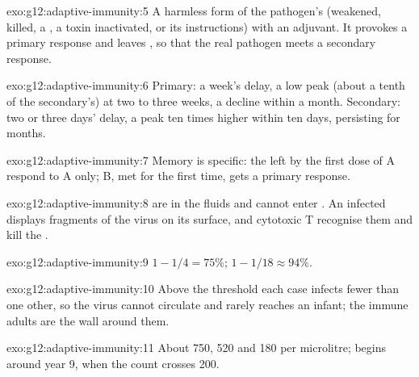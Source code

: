 \begin{solution}{exo:g12:adaptive-immunity:5}
A harmless form of the pathogen's  (weakened, killed, a
, a toxin inactivated, or its instructions) with an adjuvant.
It provokes a primary response and leaves , so that the
real pathogen meets a secondary response.
\end{solution}

\begin{solution}{exo:g12:adaptive-immunity:6}
Primary: a week's delay, a low peak (about a tenth of the
secondary's) at two to three weeks, a decline within a month.
Secondary: two or three days' delay, a peak ten times higher within
ten days, persisting for months.
\end{solution}

\begin{solution}{exo:g12:adaptive-immunity:7}
Memory is specific: the  left by the first dose of A
respond to A only; B, met for the first time, gets a primary response.
\end{solution}

\begin{solution}{exo:g12:adaptive-immunity:8}
 are  in the fluids and cannot enter . An
infected  displays fragments of the virus on its surface, and
cytotoxic T  recognise them and kill the .
\end{solution}

\begin{solution}{exo:g12:adaptive-immunity:9}
$1 - 1/4 = 75\%$; $1 - 1/18 \approx 94\%$.
\end{solution}

\begin{solution}{exo:g12:adaptive-immunity:10}
Above the threshold each case infects fewer than one other, so the
virus cannot circulate and rarely reaches an infant; the immune
adults are the wall around them.
\end{solution}

\begin{solution}{exo:g12:adaptive-immunity:11}
About 750, 520 and 180 per microlitre;  begins around year 9,
when the count crosses 200.
\end{solution}

